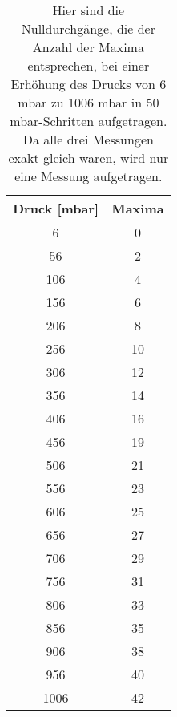     \begin{table}[h]
        \centering
        \caption{Hier sind die Nulldurchgänge, die der Anzahl der Maxima entsprechen, bei einer Erhöhung des Drucks von 6 mbar zu 1006 mbar in 50 mbar-Schritten aufgetragen. Da alle drei Messungen exakt gleich waren, wird nur eine Messung aufgetragen.}
        \label{tab:Nullen_Luft}
        \begin{tabular}{c c}
        \toprule
        {Druck [mbar]} & {Maxima} \\
        \midrule
            6     &     0   \\ 
            56    &     2   \\ 
            106   &     4   \\
            156   &     6   \\
            206   &     8   \\
            256   &    10   \\
            306   &    12   \\
            356   &    14   \\
            406   &    16   \\
            456   &    19   \\
            506   &    21   \\
            556   &    23   \\
            606   &    25   \\
            656   &    27   \\
            706   &    29   \\
            756   &    31   \\
            806   &    33   \\
            856   &    35   \\
            906   &    38   \\
            956   &    40   \\
            1006  &    42   \\
            \bottomrule
        \end{tabular}
    \end{table}

    \FloatBarrier
